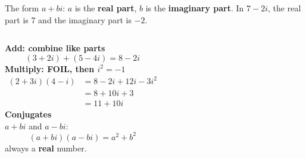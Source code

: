 \documentclass[aspectratio=169, 11pt]{beamer}
\begin{document}
\begin{frame}[t, plain]

  \begin{block}{The form}
    \(a + bi\): \(a\) is the \textbf{real part}, \(b\) is the \textbf{imaginary part}. In
    \(7 - 2i\), the real part is 7 and the imaginary part is \(-2\).
  \end{block}

  \medskip
  \begin{columns}[T]
      \textbf{Add: combine like parts}
      \[ (3 + 2i) + (5 - 4i) = 8 - 2i \]
      \textbf{Multiply: FOIL, then \(i^2 = -1\)}
      \small
      \begin{align*}
        (2 + 3i)(4 - i) &= 8 - 2i + 12i - 3i^2 \\
                        &= 8 + 10i + 3 \\
                        &= 11 + 10i
      \end{align*}
      \textbf{Conjugates}\\[3pt]
      \(a + bi\) and \(a - bi\):
      \[ (a + bi)(a - bi) = a^2 + b^2 \]
      always a \textbf{real} number.
  \end{columns}
\end{frame}
\end{document}
